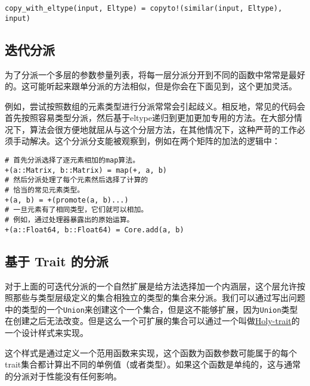 \begin{verbatim}
copy_with_eltype(input, Eltype) = copyto!(similar(input, Eltype), input)
\end{verbatim}



\hypertarget{6940352566710127049}{}


\subsection{迭代分派}



为了分派一个多层的参数参量列表，将每一层分派分开到不同的函数中常常是最好的。这可能听起来跟单分派的方法相似，但是你会在下面见到，这个更加灵活。



例如，尝试按照数组的元素类型进行分派常常会引起歧义。相反地，常见的代码会首先按照容易类型分派，然后基于eltype递归到更加更加专用的方法。在大部分情况下，算法会很方便地就屈从与这个分层方法，在其他情况下，这种严苛的工作必须手动解决。这个分派分支能被观察到，例如在两个矩阵的加法的逻辑中：




\begin{verbatim}
# 首先分派选择了逐元素相加的map算法。
+(a::Matrix, b::Matrix) = map(+, a, b)
# 然后分派处理了每个元素然后选择了计算的
# 恰当的常见元素类型。
+(a, b) = +(promote(a, b)...)
# 一旦元素有了相同类型，它们就可以相加。
# 例如，通过处理器暴露出的原始运算。
+(a::Float64, b::Float64) = Core.add(a, b)
\end{verbatim}



\hypertarget{5085783943422577248}{}


\subsection{基于 Trait 的分派}



对于上面的可迭代分派的一个自然扩展是给方法选择加一个内涵层，这个层允许按照那些与类型层级定义的集合相独立的类型的集合来分派。我们可以通过写出问题中的类型的一个\texttt{Union}来创建这个一个集合，但是这不能够扩展，因为\texttt{Union}类型在创建之后无法改变。但是这么一个可扩展的集合可以通过一个叫做\href{https://github.com/JuliaLang/julia/issues/2345\#issuecomment-54537633}{{\textquotedbl}Holy-trait{\textquotedbl}}的一个设计样式来实现。



这个样式是通过定义一个范用函数来实现，这个函数为函数参数可能属于的每个trait集合都计算出不同的单例值（或者类型）。如果这个函数是单纯的，这与通常的分派对于性能没有任何影响。




